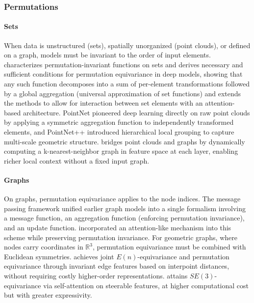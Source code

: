 \documentclass[mathematics,review,submit,moreauthors]{Definitions/mdpi}
\begin{document}
\subsubsection{Permutations}

\paragraph{Sets}
When data is unstructured (sets), spatially unorganized (point clouds), or defined on a graph, models must be invariant to the order of input elements.
\cite{zaheer2018} characterizes permutation-invariant functions on sets and derives necessary and sufficient conditions for permutation equivariance in deep models, showing that any such function decomposes into a sum of per-element transformations followed by a global aggregation (universal approximation of set functions) and \cite{lee2019p3icml} extends the methods to allow for interaction between set elements with an attention-based architecture.
PointNet \cite{qi2017a} pioneered deep learning directly on raw point clouds by applying a symmetric aggregation function to independently transformed elements, and PointNet++ \cite{qi2017} introduced hierarchical local grouping to capture multi-scale geometric structure.
\cite{wang2019} bridges point clouds and graphs by dynamically computing a k-nearest-neighbor graph in feature space at each layer, enabling richer local context without a fixed input graph.

\paragraph{Graphs}
On graphs, permutation equivariance applies to the node indices.
The message passing framework \cite{gilmer2017} unified earlier graph models \cite{duvenaud2015,kipf2017,bruna2014} into a single formalism involving a message function, an aggregation function (enforcing permutation invariance), and an update function.
\cite{velickovic2018} incorporated an attention-like mechanism into this scheme while preserving permutation invariance.
For geometric graphs, where nodes carry coordinates in $\mathbb{R}^3$, permutation equivariance must be combined with Euclidean symmetries.
\cite{satorras2021p3icml} achieves joint $E(n)$-equivariance and permutation equivariance through invariant edge features based on interpoint distances, without requiring costly higher-order representations.
\cite{fuchs2020} attains $SE(3)$-equivariance via self-attention on steerable features, at higher computational cost but with greater expressivity.
\end{document}
